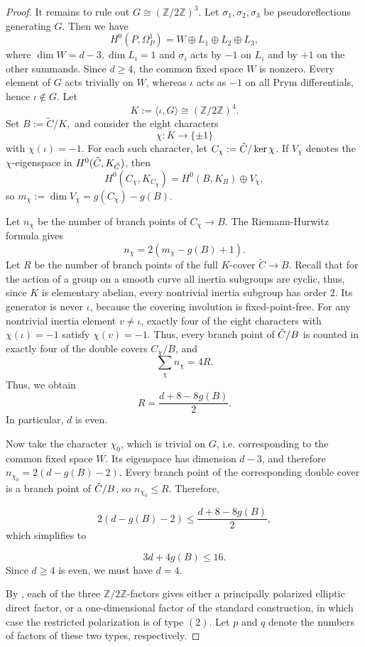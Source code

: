 \documentclass[10pt,a4paper]{amsart}
\numberwithin{equation}{section}
\newcommand{\ZZ}{\mathbb Z}
\newcommand{\tC}{\Tilde{C}}
\begin{document}
\begin{proof}
It remains to rule out $G \cong (\ZZ/2\ZZ)^3$. Let $\sigma_1, \sigma_2, \sigma_3$ be pseudoreflections generating $G$. Then we have $$H^0(P,\Omega_P^1)=W\oplus L_1\oplus L_2\oplus L_3,$$
where $\dim W=d-3, \dim L_i=1$ and $\sigma_i$ acts by $-1$ on $L_i$ and by $+1$ on the other summands. Since $d\geq4$, the common fixed space $W$ is nonzero. Every element of $G$ acts trivially on $W$, whereas $\iota$ acts as $-1$ on all Prym differentials, hence $\iota\notin G$. Let $$K:=\langle\iota,G\rangle\cong(\ZZ/2\ZZ)^4.$$
Set $B:=\widetilde C/K,$ and consider the eight characters $$\chi: K\longrightarrow\{\pm1\}$$
with $\chi(\iota)=-1$. For each such character, let $C_\chi:=\tC/\ker\chi$. If $V_\chi$ denotes the $\chi$-eigenspace in $H^0(\tC,K_{\tC})$, then $$ H^0(C_\chi,K_{C_\chi})=H^0(B,K_B)\oplus V_\chi,$$
so $m_{\chi} := \dim V_\chi=g(C_\chi)-g(B).$

Let $n_\chi$ be the number of branch points of $C_\chi\to B$. The Riemann-Hurwitz formula gives $$n_\chi=2(m_\chi-g(B)+1).$$ Let $R$ be the number of branch points of the full $K$-cover $\widetilde C\to B$. Recall that for the action of a group on a smooth curve all inertia subgroups are cyclic, thus, since $K$ is elementary abelian, every nontrivial inertia subgroup has order $2$. Its generator is never $\iota$, because the covering involution is fixed-point-free. For any nontrivial inertia element $v\neq\iota$, exactly four of the eight characters with $\chi(\iota)=-1$ satisfy $\chi(v)=-1$. Thus, every branch point of $\tC/B$ is counted in exactly four of the double covers $C_\chi/B$, and
$$\sum_\chi n_\chi=4R.$$
Thus, we obtain $$R=\frac{d+8-8g(B)}{2}.$$ In particular, $d$ is even.

Now take the character $\chi_0$, which is trivial on $G$, i.e. corresponding to the common fixed space $W$. Its eigenspace has dimension $d-3$, and therefore $n_{\chi_0}=2(d-g(B)-2).$
Every branch point of the corresponding double cover is a branch point of $\tC/B$, so $n_{\chi_0}\leq R$. Therefore,

$$2(d-g(B)-2)\leq\frac{d+8-8g(B)}{2},$$
which simplifies to

$$3d+4g(B)\leq16.$$
Since $d\geq4$ is even, we must have $d = 4$.

By \cite[Theorem 3.5 and Lemma 3.6]{ALA}, each of the three $\ZZ/2\ZZ$-factors gives either a principally
polarized elliptic direct factor, or a one-dimensional factor of the standard
construction, in which case the restricted polarization is of type $(2)$.
Let $p$ and $q$ denote the numbers of factors of these two types,
respectively. 


\end{proof}
\end{document}
